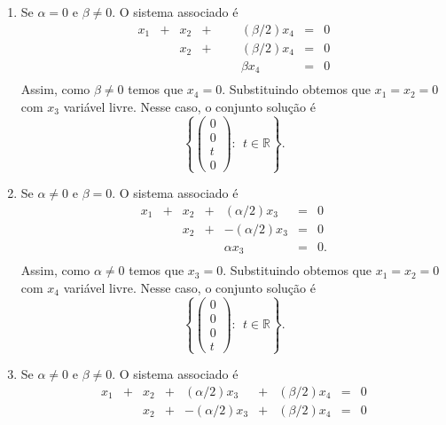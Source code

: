 \documentclass[11pt]{exam}
\begin{document}
\begin{questions}
\begin{solution}
\begin{enumerate}
      \item  Se $\alpha=0$ e $\beta\neq0$. O sistema associado é 
            $$
       \begin{matrix}
       x_1&+&x_2&+&   & &(\beta/2) x_4&=&0\\
          & &x_2&+&   & &(\beta/2) x_4&=&0\\
          & &   & &   & &\beta x_4&=&0\\
       \end{matrix}
       $$
       Assim, como $\beta\neq0$ temos que $x_4=0$. Substituindo obtemos 
       que $x_1=x_2=0$ com $x_3$ variável livre.
       Nesse caso, o conjunto solução é 
       $$ 
       \left\{
          \begin{pmatrix}
         0 \\
         0 \\
         t \\
         0
         \end{pmatrix}
         : \ \ t \in \mathbb{R}
       \right\}.
       $$ 
      \item  Se $\alpha\neq 0$ e $\beta=0$. O sistema associado é 
            $$
       \begin{matrix}
       x_1&+&x_2&+&(\alpha/2) x_3&=&0\\
          & &x_2&+&-(\alpha/2)x_3&=&0\\
          & &   & &\alpha x_3 &=&0.\\
       \end{matrix}
       $$
       Assim, como $\alpha\neq0$ temos que $x_3=0$. Substituindo obtemos 
       que $x_1=x_2=0$ com $x_4$ variável livre.
       Nesse caso, o conjunto solução é 
        $$ 
       \left\{
          \begin{pmatrix}
         0 \\
         0 \\
         0 \\
         t
         \end{pmatrix}
         : \ \ t \in \mathbb{R}
       \right\}.
       $$ 
      \item  Se $\alpha\neq 0$ e $\beta\neq0$. O sistema associado é 
            $$
       \begin{matrix}
       x_1&+&x_2&+&(\alpha/2) x_3&+&(\beta/2) x_4&=&0\\
          & &x_2&+&-(\alpha/2)x_3&+&(\beta/2) x_4&=&0\\

\end{matrix}$$
\end{enumerate}
\end{solution}
\end{questions}
\end{document}
